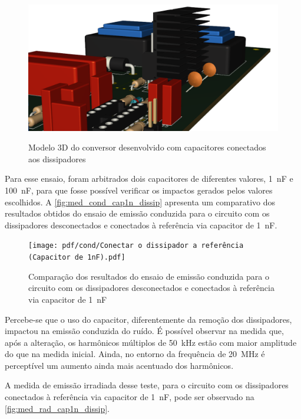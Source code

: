     \begin{figure}[H]
    	\centering
    	\caption{Modelo 3D do conversor desenvolvido com capacitores conectados aos dissipadores}
    	\includegraphics[scale=.35]{pdf/fotos/tecnica_capacitor.png}
        \label{fig:3d_tecnica_capacitor}
    \end{figure}
    
    Para esse ensaio, foram arbitrados dois capacitores de diferentes valores, \qty{1}{\nano\farad} e \qty{100}{\nano\farad}, para que fosse possível verificar os impactos gerados pelos valores escolhidos. A \autoref{fig:med_cond_cap1n_dissip} apresenta um comparativo dos resultados obtidos do ensaio de emissão conduzida para o circuito com os dissipadores desconectados e conectados à referência via capacitor de \qty{1}{\nano\farad}.
    
    \begin{figure}[H]
    	\centering
    	\caption{Comparação dos resultados do ensaio de emissão conduzida para o circuito com os dissipadores desconectados e conectados à referência via capacitor de \qty{1}{\nano\farad}}
    	\texttt{[image: pdf/cond/Conectar o dissipador a referência (Capacitor de 1nF).pdf]}
    	\label{fig:med_cond_cap1n_dissip}
    \end{figure}
    
    Percebe-se que o uso do capacitor, diferentemente da remoção dos dissipadores, impactou na emissão conduzida do ruído. É possível observar na medida que, após a alteração, os harmônicos múltiplos de \qty{50}{\kilo\hertz} estão com maior amplitude do que na medida inicial. Ainda, no entorno da frequência de \qty{20}{\mega\hertz} é perceptível um aumento ainda mais acentuado dos harmônicos. 
    
    A medida de emissão irradiada desse teste, para o circuito com os dissipadores conectados à referência via capacitor de \qty{1}{\nano\farad}, pode ser observado na \autoref{fig:med_rad_cap1n_dissip}. 
    
